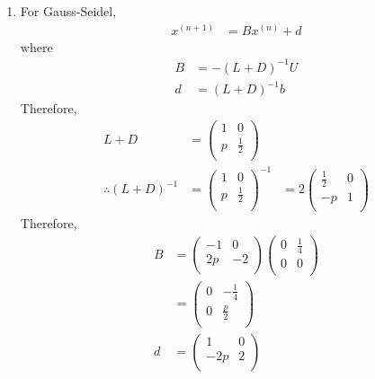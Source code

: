 \documentclass[fleqn, a4paper, 12pt, twoside, titlepage]{article}
\theoremstyle{definition}
\theoremstyle{theorem}
\begin{document}
\begin{solution}
	\begin{enumerate}[leftmargin=*]
		\item
			For Gauss-Seidel,
			\begin{align*}
				x^{(n + 1)} &= B x^{(n)} + d
			\end{align*}
			where
			\begin{align*}
				B &= -(L + D)^{-1} U\\
				d &= (L + D)^{-1} b
			\end{align*}
			Therefore,
			\begin{align*}
				L + D &=
					\begin{pmatrix}
						1 & 0\\
						p & \frac{1}{2}\\
					\end{pmatrix}\\
				\therefore (L + D)^{-1} &=
					\begin{pmatrix}
						1 & 0\\
						p & \frac{1}{2}\\
					\end{pmatrix}^{-1}
				&=
					2
					\begin{pmatrix}
						\frac{1}{2} & 0\\
						-p & 1\\
					\end{pmatrix}
			\end{align*}
			Therefore,
			\begin{align*}
				B &=
					\begin{pmatrix}
						-1 & 0\\
						2 p & -2\\
					\end{pmatrix}
					\begin{pmatrix}
						0 & \frac{1}{4}\\
						0 & 0\\
					\end{pmatrix}\\
				&=
					\begin{pmatrix}
						0 & -\frac{1}{4}\\
						0 & \frac{p}{2}\\
					\end{pmatrix}\\
				d &=
					\begin{pmatrix}
						1 & 0\\
						-2 p & 2\\
					\end{pmatrix}

\end{align*}
\end{enumerate}
\end{solution}
\end{document}
